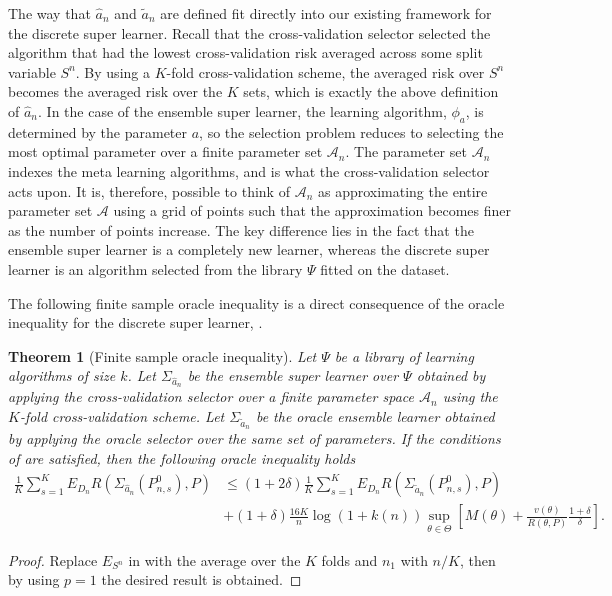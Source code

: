 \documentclass[11pt, a4paper]{article}
\newtheorem{theorem}{Theorem}
\theoremstyle{definition}
\theoremstyle{remark}
\newcommand{\btheta}{\theta}
\newcommand{\Sn}{S^n}
\newcommand{\lib}{\Psi}
\newcommand{\meta}{\phi}
\newcommand{\esl}{\Sigma}
\begin{document}
The way that $ \hat{a}_n  $ and $ \tilde{a}_n $ are defined fit directly into our existing framework for the discrete super learner. Recall that the cross-validation selector selected the algorithm that had the lowest cross-validation risk averaged across some split variable $ \Sn $. By using a $ K $-fold cross-validation scheme, the averaged risk over $ \Sn $ becomes the averaged risk over the $ K $ sets, which is exactly the above definition of $ \hat{a}_n $. In the case of the ensemble super learner, the learning algorithm, $ \meta_{a} $, is determined by the parameter $ a $, so the selection problem reduces to selecting the most optimal parameter over a finite parameter set $ \mathcal{A}_n $. The parameter set $ \mathcal{A}_n $ indexes the meta learning algorithms, and is what the cross-validation selector acts upon. It is, therefore, possible to think of $ \mathcal{A}_n $ as approximating the entire parameter set $ \mathcal{A} $ using a grid of points such that the approximation becomes finer as the number of points increase. The key difference lies in the fact that the ensemble super learner is a completely new learner, whereas the discrete super learner is an algorithm selected from the library $ \lib $ fitted on the dataset.

The following finite sample oracle inequality is a direct consequence of the oracle inequality for the discrete super learner, .
\begin{theorem}[Finite sample oracle inequality]
    Let $ \lib $ be a library of learning algorithms of size $ k $. Let $ \esl_{ \hat{a}_{n} } $ be the ensemble super learner over $ \lib $ obtained by applying the cross-validation selector over a finite parameter space $ \mathcal{A}_n $ using the $ K $-fold cross-validation scheme. Let $ \esl_{ \tilde{a}_n } $ be the oracle ensemble learner obtained by applying the oracle selector over the same set of parameters. If the conditions of  are satisfied, then the following oracle inequality holds
    \begin{align*}
        \frac{1}{K} \sum_{s = 1}^{K} E_{D_n} R(\esl_{ \hat{a}_n }(P_{n, s}^{0}) , P) &\leq (1 + 2 \delta) \frac{1}{K} \sum_{s = 1}^{K} E_{D_n} R(\esl_{ \tilde{a}_n }(P_{n,s}^{0}), P) \\
                                                                                     &+ (1 + \delta) \frac{16 K}{n} \log(1 + k(n)) \sup_{\btheta \in \Theta} \left[ M(\btheta)+ \frac{v(\btheta)}{R(\btheta, P)} \frac{1 + \delta}{\delta} \right].  
    \end{align*}
\end{theorem}
\begin{proof}
    Replace $ E_{\Sn} $ in  with the average over the $ K $ folds and $ n_1$ with $n/K $, then by using $ p = 1 $ the desired result is obtained.  
\end{proof}
\end{document}
